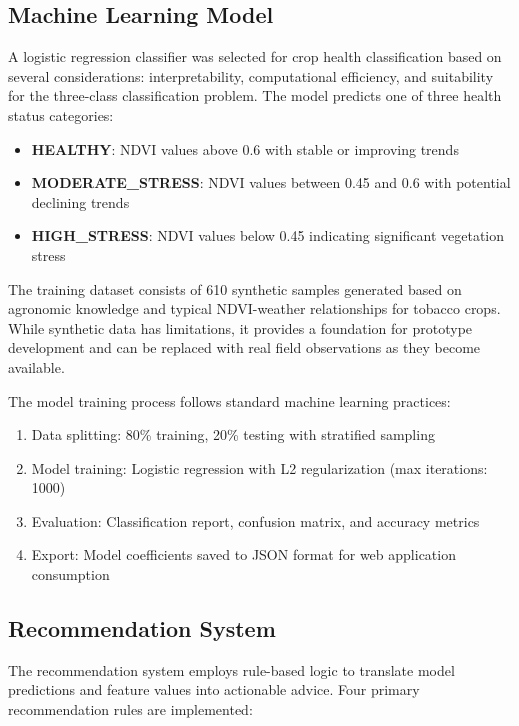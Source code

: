 \documentclass[journal]{IEEEtran}
\begin{document}
\subsection{Machine Learning Model}

A logistic regression classifier was selected for crop health classification based on several considerations: interpretability, computational efficiency, and suitability for the three-class classification problem. The model predicts one of three health status categories:

\begin{itemize}
\item \textbf{HEALTHY}: NDVI values above 0.6 with stable or improving trends
\item \textbf{MODERATE\_STRESS}: NDVI values between 0.45 and 0.6 with potential declining trends
\item \textbf{HIGH\_STRESS}: NDVI values below 0.45 indicating significant vegetation stress
\end{itemize}

The training dataset consists of 610 synthetic samples generated based on agronomic knowledge and typical NDVI-weather relationships for tobacco crops. While synthetic data has limitations, it provides a foundation for prototype development and can be replaced with real field observations as they become available.

The model training process follows standard machine learning practices:

\begin{enumerate}
\item Data splitting: 80\% training, 20\% testing with stratified sampling
\item Model training: Logistic regression with L2 regularization (max iterations: 1000)
\item Evaluation: Classification report, confusion matrix, and accuracy metrics
\item Export: Model coefficients saved to JSON format for web application consumption
\end{enumerate}

\subsection{Recommendation System}

The recommendation system employs rule-based logic to translate model predictions and feature values into actionable advice. Four primary recommendation rules are implemented:
\end{document}
